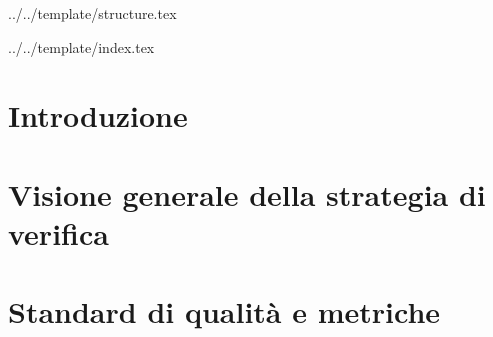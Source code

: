 


\def\DOCUMENTO{Piano di Qualifica}
\def\VERSIONE{2.0.0}

\def\REDATTORE {Agostinetto Matteo \\ & Crespan Emanuele}
\def\VERIFICATORE {Ros Fabio}
\def\RESPONSABILE {Carraro Nicola}

\def\USO {Esterno}

\def\DISTRIBUZIONE {\GRUPPO{}\\ & \COMMITTENTE{}\\ & \PROPONENTE{}\\}

\def\DESCRIZIONE {Documento riguardante le strategie di verifica e validazione adottate dal gruppo \GRUPPO\ necessarie ad assicurare i requisiti qualitativi nello svolgimento del progetto \PROGETTO.}


\def\INDICE	{true}
\def\TABELLE {true}
\def\FIGURE {true}


 {../../template/structure.tex}



 {../../template/index.tex}



%

\section{Introduzione}



\newpage
\section{Visione generale della strategia di verifica}


\newpage
\section{Standard di qualità e metriche}


